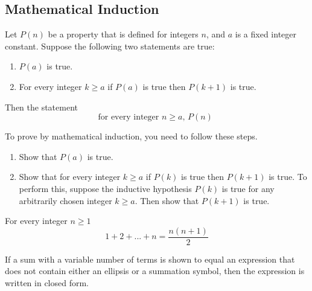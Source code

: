 \documentclass[11pt]{article}
\begin{document}
\subsection{Mathematical Induction}

\begin{definition}[Induction]\label{def:induction}
    Let $P(n)$ be a property that is defined for integers $n$, and $a$ is 
    a fixed integer constant. Suppose the following two statements are true:
    \begin{enumerate}
        \item $P(a)$ is true.
        \item For every integer $k \geq a$ if $P(a)$ is true then $P(k+1)$ is true.
    \end{enumerate}
    
    Then the statement 
    \begin{equation*}
        \text{ for every integer $n \geq a$, $P(n)$ }
    \end{equation*}
\end{definition}

To prove by mathematical induction, you need to follow these steps.

\begin{definition}\label{def:induction-steps}
    \begin{enumerate}
        \item Show that $P(a)$ is true.
        \item Show that for every integer $k \geq a$ if $P(k)$ is true then
            $P(k+1)$ is true. To perform this, suppose the inductive hypothesis
            $P(k)$ is true for any arbitrarily chosen integer $k \geq a$. 
            Then show that $P(k+1)$ is true.
    \end{enumerate}
\end{definition}

\begin{definition}\label{def:sum-of-n-integers}
    For every integer $n \geq 1$
    \begin{equation*}
        1 + 2 + ... + n = \frac{n(n+1)}{2}
    \end{equation*}
\end{definition}

\begin{definition}\label{def:closed-form}
    If a sum with a variable number of terms is shown to equal an expression
    that does not contain either an ellipsis or a summation symbol, then the
    expression is written in closed form.
\end{definition}
\end{document}
